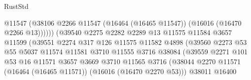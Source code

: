 \begin{lexlean}{RustStd}
\begin{coremodule}
                                            @11547
                                            (@38106
                                              @2266
                                              @11547
                                              (@16464 (@16465 @11547))
                                              (@16016 (@16470 @2266 @13))))))
                                      (@39540
                                        @2275
                                        @2282
                                        @2289
                                        @13
                                        @11575
                                        @11584
                                        @3657
                                        @11599
                                        (@39551
                                          @2274
                                          @317
                                          @126
                                          @11575
                                          @11582
                                          @4898
                                          (@39560
                                            @2273
                                            @53
                                            @55
                                            @5037
                                            @11574
                                            @11581
                                            @3710
                                            @11555
                                            @3716
                                            @38084
                                            (@39559
                                              @2271
                                              @101
                                              @53
                                              @16
                                              @11571
                                              @3657
                                              @3669
                                              @3710
                                              @11565
                                              @3716
                                              (@38044
                                                @2270
                                                @11571
                                                (@16464 (@16465 @11571))
                                                (@16016 (@16470 @2270 @53)))
                                              @38011
                                              @16400

\end{coremodule}
\end{lexlean}
